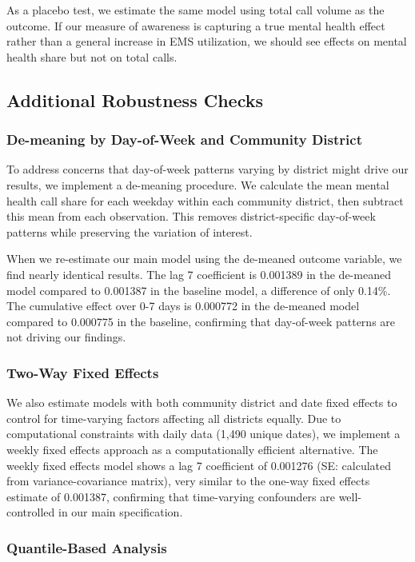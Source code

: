 \documentclass[11pt,a4paper]{article}
\begin{document}
As a placebo test, we estimate the same model using total call volume as the outcome. If our measure of awareness is capturing a true mental health effect rather than a general increase in EMS utilization, we should see effects on mental health share but not on total calls.

\subsection{Additional Robustness Checks}

\subsubsection{De-meaning by Day-of-Week and Community District}

To address concerns that day-of-week patterns varying by district might drive our results, we implement a de-meaning procedure. We calculate the mean mental health call share for each weekday within each community district, then subtract this mean from each observation. This removes district-specific day-of-week patterns while preserving the variation of interest.

When we re-estimate our main model using the de-meaned outcome variable, we find nearly identical results. The lag 7 coefficient is 0.001389 in the de-meaned model compared to 0.001387 in the baseline model, a difference of only 0.14\%. The cumulative effect over 0-7 days is 0.000772 in the de-meaned model compared to 0.000775 in the baseline, confirming that day-of-week patterns are not driving our findings.

\subsubsection{Two-Way Fixed Effects}

We also estimate models with both community district and date fixed effects to control for time-varying factors affecting all districts equally. Due to computational constraints with daily data (1,490 unique dates), we implement a weekly fixed effects approach as a computationally efficient alternative. The weekly fixed effects model shows a lag 7 coefficient of 0.001276 (SE: calculated from variance-covariance matrix), very similar to the one-way fixed effects estimate of 0.001387, confirming that time-varying confounders are well-controlled in our main specification.

\subsubsection{Quantile-Based Analysis}
\end{document}
